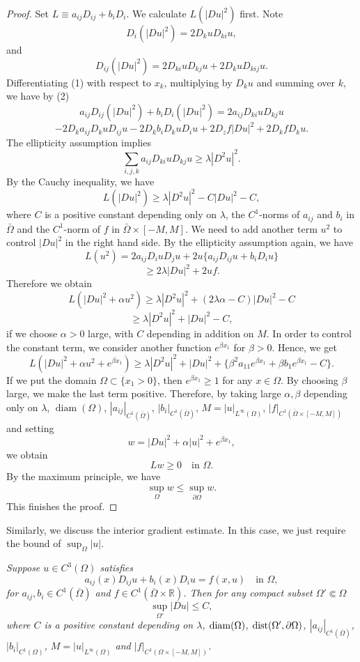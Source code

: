 \begin{proof}
\sketch
Set $L \equiv a_{ij}D_{ij} + b_iD_i$. We calculate $L(|Du|^2)$ first. Note
\[
D_i(|Du|^2)=2D_kuD_{ki}u,
\]
and
\begin{equation}
D_{ij}(|Du|^2)=2D_{ki}uD_{kj}u+2D_kuD_{kij}u.
\tag{2}
\end{equation}
Differentiating (1) with respect to $x_k$, multiplying by $D_ku$ and summing over $k$, we have by (2)
\[
a_{ij}D_{ij}(|Du|^2)+b_iD_i(|Du|^2)=2a_{ij}D_{ki}uD_{kj}u
\]
\[
- 2D_ka_{ij}D_kuD_{ij}u-2D_kb_iD_kuD_iu+2D_zf|Du|^2+2D_kfD_ku.
\]
The ellipticity assumption implies
\[
\sum_{i,j,k} a_{ij}D_{ki}uD_{kj}u \geq \lambda |D^2u|^2.
\]
By the Cauchy inequality, we have
\[
L(|Du|^2) \geq \lambda |D^2u|^2 - C|Du|^2 - C,
\]
where $C$ is a positive constant depending only on $\lambda$, the $C^1$-norms of $a_{ij}$ and $b_i$ in $\bar{\Omega}$ and the $C^1$-norm of $f$ in $\bar{\Omega}\times[-M,M]$. We need to add another term $u^2$ to control $|Du|^2$ in the right hand side. By the ellipticity assumption again, we have
\[
L(u^2)=2a_{ij}D_iuD_ju+2u\{a_{ij}D_{ij}u+b_iD_i u\}
\]
\[
\geq 2\lambda |Du|^2+2uf.
\]
Therefore we obtain
\[
L(|Du|^2+\alpha u^2)\geq \lambda |D^2u|^2+(2\lambda\alpha-C)|Du|^2-C
\]
\[
\geq \lambda |D^2u|^2+|Du|^2-C,
\]
if we choose $\alpha>0$ large, with $C$ depending in addition on $M$. In order to control the constant term, we consider another function $e^{\beta x_1}$ for $\beta>0$. Hence, we get
\[
L(|Du|^2+\alpha u^2+e^{\beta x_1})\geq \lambda |D^2u|^2+|Du|^2+\{\beta^2a_{11}e^{\beta x_1}+\beta b_1e^{\beta x_1}-C\}.
\]
If we put the domain $\Omega \subset \{x_1>0\}$, then $e^{\beta x_1}\geq 1$ for any $x \in \Omega$. By choosing $\beta$ large, we make the last term positive. Therefore, by taking large $\alpha,\beta$ depending only on $\lambda$, $\operatorname{diam}(\Omega)$, $|a_{ij}|_{C^1(\bar{\Omega})}$, $|b_i|_{C^1(\bar{\Omega})}$, $M = |u|_{L^\infty(\Omega)}$, $|f|_{C^1(\bar{\Omega}\times[-M,M])}$ and setting
\[
w = |Du|^2+\alpha |u|^2+e^{\beta x_1},
\]
we obtain
\[
Lw \geq 0 \quad \text{in } \Omega.
\]
By the maximum principle, we have
\[
\sup_{\Omega} w \leq \sup_{\partial\Omega} w.
\]
This finishes the proof.
\end{proof}

Similarly, we discuss the interior gradient estimate. In this case, we just require the bound of \(\sup_{\Omega}|u|\).

\begin{proposition}\label{hanlin:maxprin-prop-2-28}
\textit{Suppose \(u \in C^3(\Omega)\) satisfies}
\[
a_{ij}(x)D_{ij}u + b_i(x)D_i u = f(x,u) \quad \text{in } \Omega,
\]
\textit{for \(a_{ij}, b_i \in C^1(\overline{\Omega})\) and \(f \in C^1(\overline{\Omega}\times \mathbb R)\). Then for any compact subset \(\Omega' \Subset \Omega\)}
\[
\sup_{\Omega'} |Du| \leq C,
\]
\textit{where \(C\) is a positive constant depending on \(\lambda\), \(\operatorname{diam}(\Omega)\), \(\operatorname{dist}(\Omega', \partial\Omega)\), \(|a_{ij}|_{C^1(\overline{\Omega})}\), \(|b_i|_{C^1(\Omega)}\), \(M = |u|_{L^\infty(\Omega)}\) and \(|f|_{C^1(\Omega\times[-M,M])}\).}
\end{proposition}

